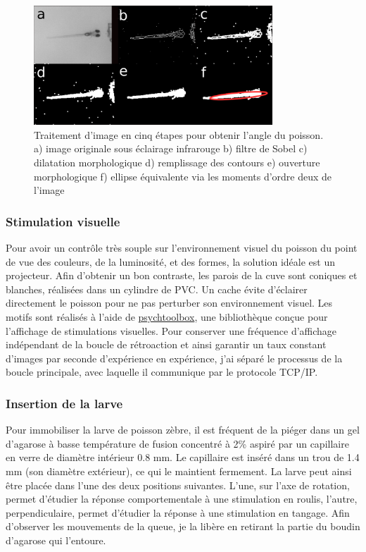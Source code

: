 \begin{figure}
\centering
\includegraphics[width=0.8\textwidth]{./files/image_process.png}
\caption{Traitement d'image en cinq étapes pour obtenir l'angle du poisson. a) image originale sous éclairage infrarouge b) filtre de Sobel c) dilatation morphologique d) remplissage des contours e) ouverture morphologique f) ellipse équivalente via les moments d'ordre deux de l'image}
\end{figure}


\subsubsection{Stimulation visuelle}
Pour avoir un contrôle très souple sur l'environnement visuel du poisson du point de vue des couleurs, de la luminosité, et des formes, la solution idéale est un projecteur. Afin d'obtenir un bon contraste, les parois de la cuve sont coniques et blanches, réalisées dans un cylindre de PVC. Un cache évite d'éclairer directement le poisson pour ne pas perturber son environnement visuel. Les motifs sont réalisés à l'aide de \href{http://psychtoolbox.org/}{psychtoolbox}, une bibliothèque conçue pour l'affichage de stimulations visuelles. Pour conserver une fréquence d'affichage indépendant de la boucle de rétroaction et ainsi garantir un taux constant d'images par seconde d'expérience en expérience, j'ai séparé le processus de la boucle principale, avec laquelle il communique par le protocole TCP/IP.

\subsubsection{Insertion de la larve}
Pour immobiliser la larve de poisson zèbre, il est fréquent de la piéger dans un gel d'agarose à basse température de fusion concentré à 2\% aspiré par un capillaire en verre de diamètre intérieur 0.8 mm. Le capillaire est inséré dans un trou de 1.4 mm (son diamètre extérieur), ce qui le maintient fermement. La larve peut ainsi être placée dans l'une des deux positions suivantes. L'une, sur l'axe de rotation, permet d'étudier la réponse comportementale à une stimulation en roulis, l'autre, perpendiculaire, permet d'étudier la réponse à une stimulation en tangage. Afin d'observer les mouvements de la queue, je la libère en retirant la partie du boudin d'agarose qui l'entoure. 

